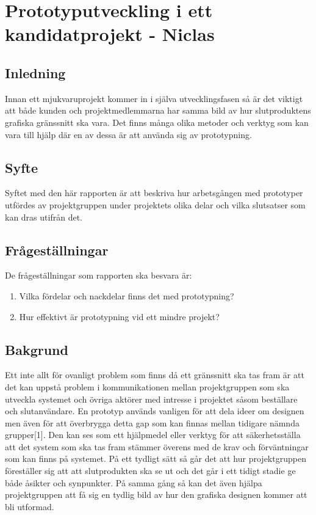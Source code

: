 \chapter{Prototyputveckling i ett kandidatprojekt - Niclas}

\section{Inledning}
Innan ett mjukvaruprojekt kommer in i själva utvecklingsfasen så är det viktigt att både kunden och projektmedlemmarna har samma bild av hur slutproduktens grafiska gränssnitt ska vara. Det finns många olika metoder och verktyg som kan vara till hjälp där en av dessa är att använda sig av prototypning.   

\section{Syfte}
Syftet med den här rapporten är att beskriva hur arbetsgången med prototyper utfördes av projektgruppen under projektets olika delar och vilka slutsatser som kan dras utifrån det.   

\section{Frågeställningar}
De frågeställningar som rapporten ska besvara är:
\begin{enumerate}
	\item Vilka fördelar och nackdelar finns det med prototypning?
	\item Hur effektivt är prototypning vid ett mindre projekt?
\end{enumerate}

\section{Bakgrund}
Ett inte allt för ovanligt problem som finns då ett gränssnitt ska tas fram är att det kan uppstå problem i kommunikationen mellan projektgruppen som ska utveckla systemet och övriga aktörer med intresse i projektet såsom beställare och slutanvändare. En prototyp används vanligen för att dela ideer om designen men även för att överbrygga detta gap som kan finnas mellan tidigare nämnda grupper[1]. Den kan ses som ett hjälpmedel eller verktyg för att säkerhetsställa att det system som ska tas fram stämmer överens med de krav och förväntningar som kan finns på systemet. På ett tydligt sätt så går det att hur projektgruppen föreställer sig att att slutprodukten ska se ut och det går i ett tidigt stadie ge både åsikter och synpunkter. På samma gång så kan det även hjälpa projektgruppen att få sig en tydlig bild av hur den grafiska designen kommer att bli utformad.

